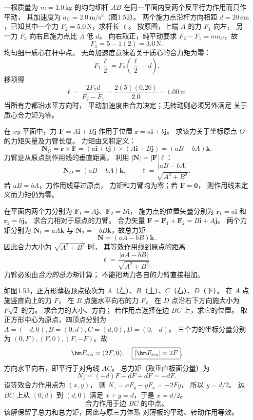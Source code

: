 一根质量为 $m=1.0\,\mathrm{kg}$ 的均匀细杆 $AB$
在同一平面内受两个反平行力作用而只作平动，
其加速度为 $a_C=2.0\,\mathrm{m/s^2}$（图1.52）。
两个施力点沿杆方向相距
$d=20\,\mathrm{cm}$，已知其中一个力
$F_2=5.0\,\mathrm N$，求杆长 $\ell$。
\exsolution
按原图，上端 $A$ 的力 $F_1$ 向左，
另一力 $F_2$ 向右且施力点比 $A$ 低 $d$。
向右取正，纯平动要求
$F_2-F_1=ma_C$，故
\[
F_1=5-1(2)=3.0\,\mathrm N.
\]
均匀细杆质心在杆中点。
无角加速度意味着关于质心的合力矩为零：
\[
F_1\frac{\ell}{2}
=F_2\left(\frac{\ell}{2}-d\right).
\]
移项得
\[
\boxed{\ell=\frac{2F_2d}{F_2-F_1}
=\frac{2(5)(0.20)}{2.0}=1.00\,\mathrm m}.
\]
\excheck 当所有力都沿水平方向时，
平动加速度由合力决定；无转动则必须另外满足
关于质心合力矩为零。

在 $xy$ 平面中，力
$\bm F=A\bm i+B\bm j$ 作用于位置
$\bm r=a\bm i+b\bm j$。
求该力关于坐标原点 $O$ 的力矩矢量及力臂长度。
\exsolution
力矩由叉积定义：
\[
\bm N_O=\bm r\times\bm F
=(a\bm i+b\bm j)\times(A\bm i+B\bm j)
=(aB-bA)\bm k.
\]
力臂是从原点到作用线的垂直距离，
利用 $|\bm N|=|\bm F|\ell$：
\[
\boxed{\bm N_O=(aB-bA)\bm k},\qquad
\boxed{\ell=\frac{|aB-bA|}{\sqrt{A^2+B^2}}}.
\]
\excheck 若 $aB=bA$，力作用线穿过原点，
力矩和力臂均为零；若 $\bm F=\bm0$，
则作用线未定义而力矩仍为零。

在平面内两个力分别为
$\bm F_1=A\bm j$、$\bm F_2=B\bm i$，
施力点的位置矢量分别为
$\bm r_1=a\bm i$ 和 $\bm r_2=b\bm j$。
求合力相对于原点的力臂。
\exsolution
合力矢量
$\bm F=\bm F_1+\bm F_2=B\bm i+A\bm j$。
两个力矩分别为
$\bm N_1=aA\bm k$ 与
$\bm N_2=-bB\bm k$，故总力矩
\[
\bm N=(aA-bB)\bm k.
\]
因此合力大小为 $\sqrt{A^2+B^2}$ 时，
其等效作用线到原点的距离
\[
\boxed{\ell=\frac{|aA-bB|}{\sqrt{A^2+B^2}}}.
\]
\excheck 力臂必须由\emph{合力的总力矩}计算；
不能把两力各自的力臂直接相加。

如图1.53，正方形薄板顶点依次为
$A$（左）、$B$（上）、$C$（右）、$D$（下）。
在 $A$ 点施竖直向上的力 $F$，
在 $B$ 点施水平向右的力 $F$，
在 $D$ 点沿右下方向施大小为 $F\sqrt2$ 的力。
求合力的大小、方向；
若作用点选择在边 $BC$ 上，求它的位置。
\exsolution
取正方形中心为原点，四顶点分别为
$A=(-d,0),B=(0,d),C=(d,0),D=(0,-d)$。
三个力的坐标分量分别为
$(0,F),(F,0),(F,-F)$。故
\[
\bm F_{\rm res}=(2F,0),
\quad\boxed{|\bm F_{\rm res}|=2F},
\]
方向水平向右，即平行于对角线 $AC$。
总力矩（取垂直板面分量）为
\[
N_z=(-d)F-dF+dF=-dF.
\]
设等效合力作用点为 $(x,y)$，
则 $N_z=xF_y-yF_x=-2Fy$，
所以 $y=d/2$。
边 $BC$ 上从 $(0,d)$ 到 $(d,0)$
满足 $x+y=d$，于是 $x=d/2$。
\[
\boxed{\text{合力作用于边 }BC\text{ 的中点。}}
\]
\excheck 该解保留了总力和总力矩，因此与原三力体系
对薄板的平动、转动作用等效。

